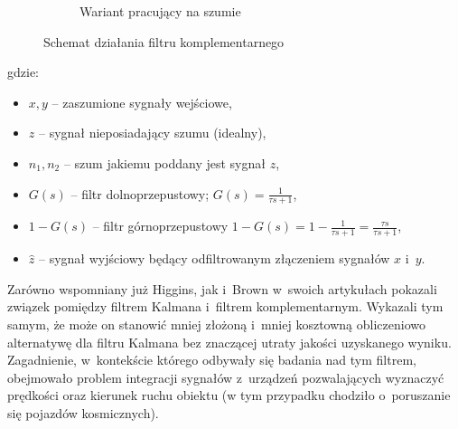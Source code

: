 \begin{savenotes}
\begin{figure}[h]
\begin{subfigure}[b]{0.49\textwidth}
			\caption{Wariant pracujący na szumie}
			\label{fig:appx:CF:algorithmB}			
		\end{subfigure}
		\caption{Schemat działania filtru komplementarnego}
		\label{fig:appx:CF:algorithm}					
	\end{figure}
\end{savenotes}
				
gdzie:
\begin{itemize}
	\item $x, y$ -- zaszumione sygnały wejściowe,
	\item $z$ -- sygnał nieposiadający szumu (idealny),
	\item $n_1, n_2$ -- szum jakiemu poddany jest sygnał $z$,
	\item $G(s)$ -- filtr dolnoprzepustowy; $G(s) = \frac{1}{{\tau}s+1}$,
	\item $1 - G(s)$ -- filtr górnoprzepustowy $1 - G(s) = 1 - \frac{1}{{\tau}s+1} = \frac{{\tau}s}{{\tau}s+1}$,
	\item $\widehat{z}$ -- sygnał wyjściowy będący odfiltrowanym złączeniem sygnałów $x$ i~$y$.
\end{itemize}
				
Zarówno wspomniany już Higgins, jak i~Brown \cite{BROWN1972} w~swoich artykułach pokazali związek pomiędzy filtrem Kalmana i~filtrem komplementarnym. Wykazali tym samym, że może on stanowić mniej złożoną i~mniej kosztowną obliczeniowo alternatywę dla filtru Kalmana bez znaczącej utraty jakości uzyskanego wyniku. Zagadnienie, w~kontekście którego odbywały się badania nad tym filtrem, obejmowało problem integracji sygnałów z~urządzeń pozwalających wyznaczyć prędkości oraz kierunek ruchu obiektu (w tym przypadku chodziło o~poruszanie się pojazdów kosmicznych).
